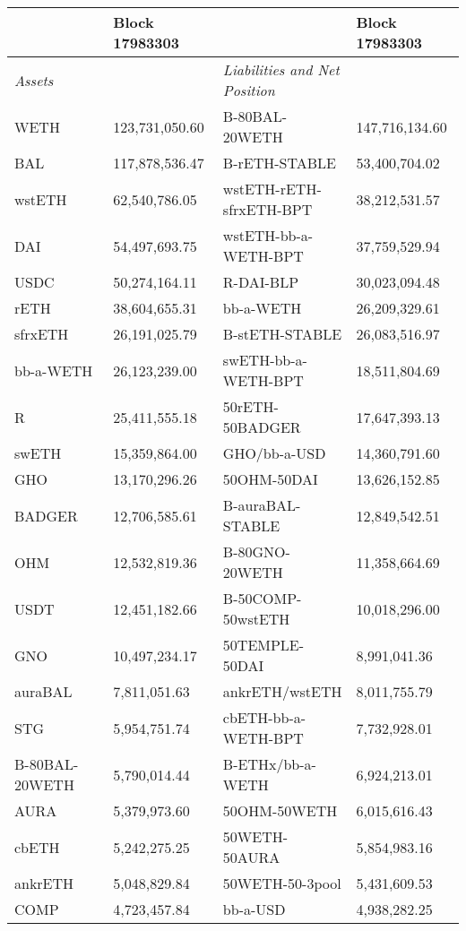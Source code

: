 
\begin{longtable}{@{}p{0.25\linewidth}p{0.25\linewidth}p{0.25\linewidth}p{0.25\linewidth}@{}}

\toprule


& Block 17983303 & & Block 17983303 \\

\midrule
\textit{Assets} & & \textit{Liabilities and Net Position} \\
WETH & 123,731,050.60 & B-80BAL-20WETH & 147,716,134.60 \\
BAL & 117,878,536.47 & B-rETH-STABLE & 53,400,704.02 \\
wstETH & 62,540,786.05 & wstETH-rETH-sfrxETH-BPT & 38,212,531.57 \\
DAI & 54,497,693.75 & wstETH-bb-a-WETH-BPT & 37,759,529.94 \\
USDC & 50,274,164.11 & R-DAI-BLP & 30,023,094.48 \\
rETH & 38,604,655.31 & bb-a-WETH & 26,209,329.61 \\
sfrxETH & 26,191,025.79 & B-stETH-STABLE & 26,083,516.97 \\
bb-a-WETH & 26,123,239.00 & swETH-bb-a-WETH-BPT & 18,511,804.69 \\
R & 25,411,555.18 & 50rETH-50BADGER & 17,647,393.13 \\
swETH & 15,359,864.00 & GHO/bb-a-USD & 14,360,791.60 \\
GHO & 13,170,296.26 & 50OHM-50DAI & 13,626,152.85 \\
BADGER & 12,706,585.61 & B-auraBAL-STABLE & 12,849,542.51 \\
OHM & 12,532,819.36 & B-80GNO-20WETH & 11,358,664.69 \\
USDT & 12,451,182.66 & B-50COMP-50wstETH & 10,018,296.00 \\
GNO & 10,497,234.17 & 50TEMPLE-50DAI & 8,991,041.36 \\
auraBAL & 7,811,051.63 & ankrETH/wstETH & 8,011,755.79 \\
STG & 5,954,751.74 & cbETH-bb-a-WETH-BPT & 7,732,928.01 \\
B-80BAL-20WETH & 5,790,014.44 & B-ETHx/bb-a-WETH  & 6,924,213.01 \\
AURA & 5,379,973.60 & 50OHM-50WETH & 6,015,616.43 \\
cbETH & 5,242,275.25 & 50WETH-50AURA & 5,854,983.16 \\
ankrETH & 5,048,829.84 & 50WETH-50-3pool & 5,431,609.53 \\
COMP & 4,723,457.84 & bb-a-USD & 4,938,282.25 \\

\end{longtable}
